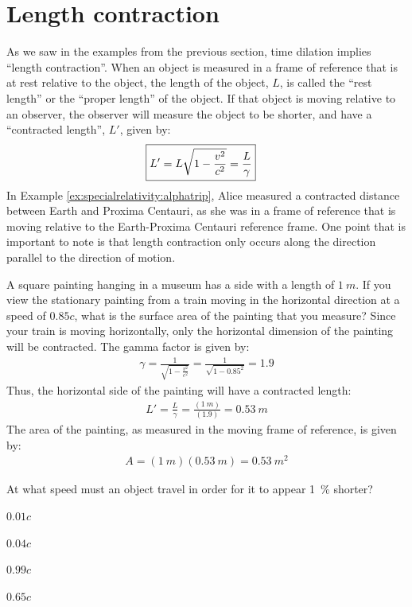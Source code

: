 \section{Length contraction}
As we saw in the examples from the previous section, time dilation implies ``length contraction''. When an object is measured in a frame of reference that is at rest relative to the object, the length of the object, $L$, is called the ``rest length'' or the ``proper length'' of the object. If that object is moving relative to an observer, the observer will measure the object to be shorter, and have a ``contracted length'', $L'$, given by:
\begin{align*}
\Aboxed{L'=L\sqrt{1-\frac{v^2}{c^2}} =\frac{L}{\gamma}}
\end{align*}
In Example \ref{ex:specialrelativity:alphatrip}, Alice measured a contracted distance between Earth and Proxima Centauri, as she was in a frame of reference that is moving relative to the Earth-Proxima Centauri reference frame. One point that is important to note is that length contraction only occurs along the direction parallel to the direction of motion.
\begin{example}{A square painting hanging in a museum has a side with a length of $\SI{1}{m}$. If you view the stationary painting from a train moving in the horizontal direction at a speed of $0.85c$, what is the surface area of the painting that you measure?}
Since your train is moving horizontally, only the horizontal dimension of the painting will be contracted. The gamma factor is given by:
\begin{align*}
\gamma = \frac{1}{\sqrt{1-\frac{v^2}{c^2}}} =\frac{1}{\sqrt{1-0.85^2}}=1.9
\end{align*}
Thus, the horizontal side of the painting will have a contracted length:
\begin{align*}
L'=\frac{L}{\gamma}=\frac{(\SI{1}{m})}{(1.9)}=\SI{0.53}{m}
\end{align*}
The area of the painting, as measured in the moving frame of reference, is given by:
\begin{align*}
A= (\SI{1}{m})(\SI{0.53}{m})=\SI{0.53}{m^2}
\end{align*}
\end{example}
\begin{checkpoint}{}
	\begin{MCquestion}{At what speed must an object travel in order for it to appear \SI{1}{\percent} shorter?}
		\item $0.01c$
		\item $0.04c$ \correct
		\item $0.99c$
		\item $0.65c$
	\end{MCquestion}
\end{checkpoint}
